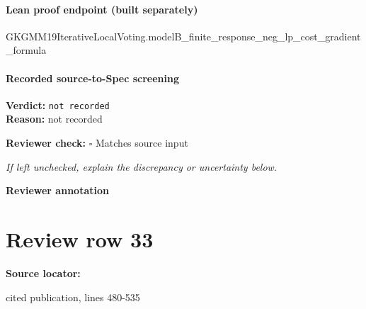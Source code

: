 \documentclass[10pt]{article}
\newcommand{\reviewerbox}{%
  \par\noindent\fbox{\parbox{0.96\linewidth}{\rule{0pt}{0.38in}}}\par
}
\newcommand{\reviewmatch}[1]{%
  \par\noindent\textbf{Reviewer check:} $\square$\; #1\par
  \noindent\emph{If left unchecked, explain the discrepancy or uncertainty below.}\par
}
\begin{document}
\paragraph{Lean proof endpoint (built separately)}\begin{ReviewVerbatim}
GKGMM19IterativeLocalVoting.modelB_finite_response_neg_lp_cost_gradient_formula
\end{ReviewVerbatim}

\paragraph{Recorded source-to-Spec screening}
\textbf{Verdict:} \texttt{not recorded}
\\
\textbf{Reason:} not recorded
\reviewmatch{Matches source input}
\noindent\textbf{Reviewer annotation}\par
\reviewerbox
\clearpage
\hypertarget{source-claim-0bfa667fe6808e39}{}
\section*{Review row 33}
\textbf{Source locator:} {\footnotesize\raggedright cited publication, lines 480-\allowbreak{}535\par}
\end{document}
